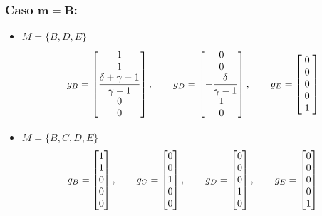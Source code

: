 \subsubsection*{Caso $\boldsymbol{m = B}$:}
\begin{itemize}
    \item $M = \{B,D,E\}$
    \[ \everymath{\displaystyle} g_B = \left[\begin{matrix}1\\1\\\frac{\delta + \gamma - 1}{\gamma - 1}\\0\\0\end{matrix}\right], \hspace*{2em}
    g_D = \left[\begin{matrix}0\\0\\- \frac{\delta}{\gamma - 1}\\1\\0\end{matrix}\right], \hspace*{2em}
    g_E = \left[\begin{matrix}\;0\;\\\;0\;\\\;0\;\\\;0\;\\\;1\;\end{matrix}\right] \]
    \item $M = \{B,C,D,E\}$
    \renewcommand*{\arraystretch}{1}
    \[  
    g_B = \left[\begin{matrix}1\\1\\0\\0\\0\end{matrix}\right], \hspace*{2em}
    g_C = \left[\begin{matrix}0\\0\\1\\0\\0\end{matrix}\right], \hspace*{2em}
    g_D = \left[\begin{matrix}0\\0\\0\\1\\0\end{matrix}\right], \hspace*{2em}
    g_E = \left[\begin{matrix}0\\0\\0\\0\\1\end{matrix}\right]\]
\end{itemize}

